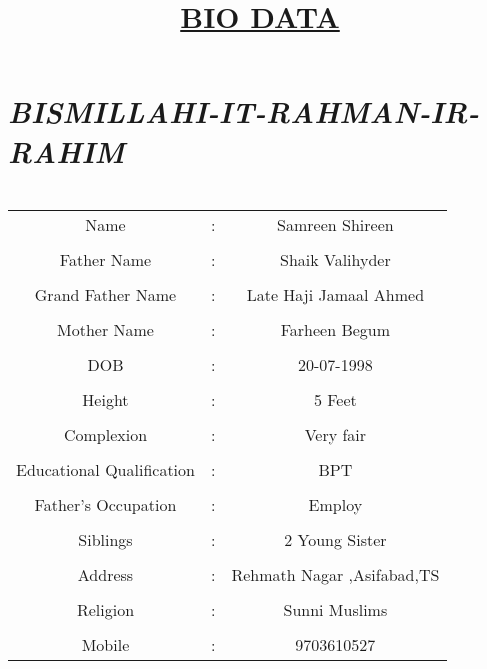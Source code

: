\documentclass[a4paper,10pt]{article}
\title{\textbf{\underline{BIO DATA}}}
\date{}
\begin{document}
\maketitle
\section*{\centering \textit{BISMILLAHI-IT-RAHMAN-IR-RAHIM}}
\section*{}
\begin{tabular}{c         c         c}
 Name & : & Samreen Shireen \\
&&\\
\raggedleft Father Name & : & Shaik Valihyder\\
&&\\
Grand Father Name & : & Late Haji Jamaal Ahmed \\
&&\\
Mother Name & : & Farheen Begum\\
&&\\
DOB &:&20-07-1998\\
&&\\
Height & :& 5 Feet\\
&&\\
Complexion &:& Very fair\\
&&\\
Educational Qualification&:& BPT\\
&&\\
Father's Occupation &:& Employ\\
&&\\
Siblings &:& 2 Young Sister\\
&&\\
 Address &:& Rehmath Nagar ,Asifabad,TS\\
 &&\\
 Religion&:& Sunni Muslims\\
 &&\\
 Mobile&:& 9703610527\\
 
\end{tabular}
\end{document}
